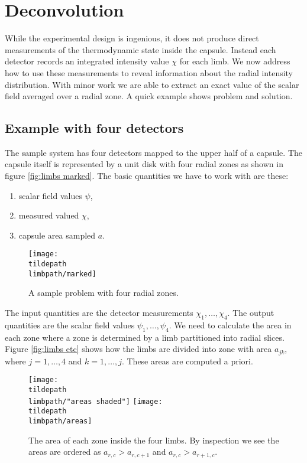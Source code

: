\section{\label{sec:measurement:deconvolution}Deconvolution}

While the experimental design is ingenious, it does not produce direct measurements of the thermodynamic state inside the capsule. Instead each detector records an integrated intensity value $\chi$ for each limb. We now address how to use these measurements to reveal information about the radial intensity distribution. With minor work we are able to extract an exact value of the scalar field averaged over a radial zone. A quick example shows problem and solution.

\subsection{Example with four detectors}
The sample system has four detectors mapped to the upper half of a capsule. The capsule itself is represented by a unit disk with four radial zones as shown in figure \eqref{fig:limbs marked}. The basic quantities we have to work with are these:
\begin{enumerate}
\item scalar field values $\psi$,
\item measured valued $\chi$,
\item capsule area sampled $a$.
\end{enumerate}
\begin{figure}[htbp] 
   \centering
   \texttt{[image: \\tildepath\\limbpath/marked]}
   \caption[A sample problem with four radial zones]{A sample problem with four radial zones.}
   \label{fig:limbs marked}
\end{figure}

The input quantities are the detector measurements $\chi_{1},\dots,\chi_{4}$. The output quantities are the scalar field values $\psi_{1},\dots,\psi_{4}$. We need to calculate the area in each zone where a zone is determined by a limb partitioned into radial slices. Figure \eqref{fig:limbs etc} shows how the limbs are divided into zone with area $a_{jk}$, where $j=1,\dots,4$ and $k=1,\dots,j$. These areas are computed a priori.
 \begin{figure}[htbp]
   \centering
%
   \texttt{[image: \\tildepath\\limbpath/"areas shaded"]} \qquad 
%
   \texttt{[image: \\tildepath\\limbpath/areas]} 
%
   \caption[The area of each zone inside the four limbs]{The area of each zone inside the four limbs. By inspection we see the areas are ordered as $a_{r,c}>a_{r,c+1}$ and $a_{r,c}>a_{r+1,c}$.}
   \label{fig:limbs etc}
\end{figure}


